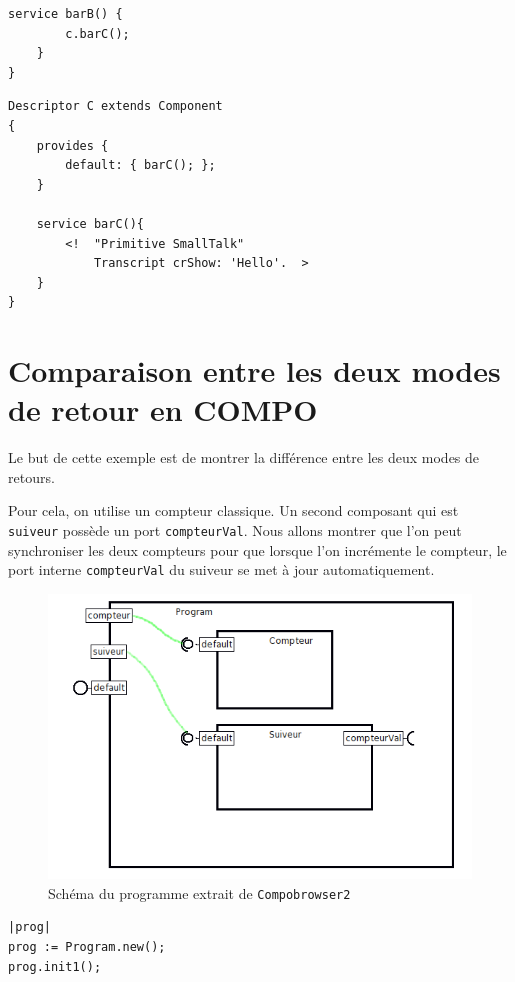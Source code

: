 \documentclass[11pt,a4paper,openany,oneside]{book}
\begin{document}
\begin{appendices}
\begin{lstlisting}[language=Compo, frame=single, caption=Programme B]
	service barB() {
		c.barC();
	}
}
\end{lstlisting}

\begin{lstlisting}[language=Compo, frame=single, caption=Programme C]
Descriptor C extends Component
{
	provides {
		default: { barC(); };
	}
	
	service barC(){
		<!	"Primitive SmallTalk"
		    Transcript crShow: 'Hello'.	 > 
	}
}
\end{lstlisting}




\chapter{Comparaison entre les deux modes de retour en COMPO}
\label{annexeretourcomparaison}

Le but de cette exemple est de montrer la différence entre les deux modes de retours.

Pour cela, on utilise un compteur classique. Un second composant qui est \texttt{suiveur} possède un port \texttt{compteurVal}. Nous allons montrer que l'on peut synchroniser les deux compteurs pour que lorsque l'on incrémente le compteur, le port interne \texttt{compteurVal} du suiveur se met à jour automatiquement.

\begin{figure}[H]
\centering
\includegraphics[scale=0.7, keepaspectratio=true]{CompteurSuiveur}
\caption{Schéma du programme extrait de \texttt{Compobrowser2}}
\label{compteursuiveur}
\end{figure}

\clearpage

\begin{lstlisting}[language=Compo, frame=single, caption=Workspace (Retour classique)]
|prog|
prog := Program.new();
prog.init1();


\end{lstlisting}
\end{appendices}
\end{document}
